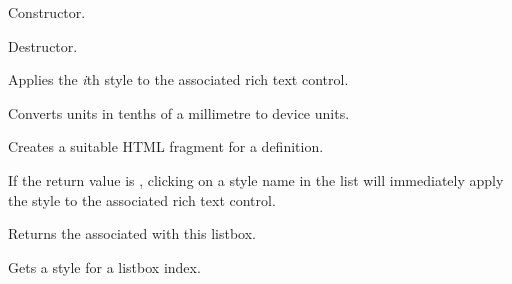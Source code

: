 Constructor.

\label{wxrichtextstylelistboxdtor}


Destructor.

\label{wxrichtextstylelistboxapplystyle}


Applies the {\it i}th style to the associated rich text control.

\label{wxrichtextstylelistboxconverttenthsmmtopixels}


Converts units in tenths of a millimetre to device units.

\label{wxrichtextstylelistboxcreatehtml}


Creates a suitable HTML fragment for a definition.

\label{wxrichtextstylelistboxgetapplyonselection}


If the return value is \true, clicking on a style name in the list will immediately
apply the style to the associated rich text control.

\label{wxrichtextstylelistboxgetrichtextctrl}


Returns the  associated with this listbox.

\label{wxrichtextstylelistboxgetstyle}


Gets a style for a listbox index.

\label{wxrichtextstylelistboxgetstylesheet}

